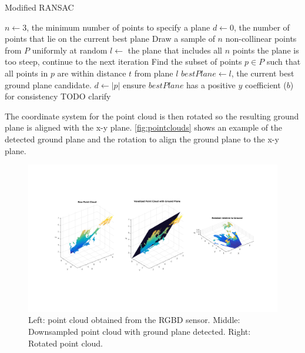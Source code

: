 \begin{algorithm}
\caption{Modified RANSAC}
\label{alg:modifiedRansac}
\begin{algorithmic}[1]
\Statex
{}
    \State $n \gets 3$, the minimum number of points to specify a plane
    \State $d \gets 0$, the number of points that lie on the current best plane
        \State Draw a sample of $n$ non-collinear points from $P$ uniformly at random
        \State $l \gets$ the plane that includes all $n$ points
            \State the plane is too steep, continue to the next iteration
        \EndIf
        \State Find the subset of points $p \in P$ such that all points in $p$ are
        within distance $t$ from plane $l$
            \State $bestPlane \gets l$, the current best ground plane candidate.
            \State $d \gets |p|$
        \EndIf
    \EndFor
    \State ensure $bestPlane$ has a positive $y$ coefficient ($b$) for consistency TODO clarify
\EndFunction
\Statex
{}
\end{algorithmic}
\end{algorithm}

The coordinate system for the point cloud is then rotated so the resulting
ground plane is aligned with the x-y plane. \autoref{fig:pointclouds} shows an
example of the detected ground plane and the rotation to align the ground plane
to the x-y plane.

\begin{figure}
\centering
\includegraphics[width=6in]{figures/pointclouds.png}
\caption{Left: point cloud obtained from the RGBD sensor. Middle:
Downsampled point cloud with ground plane detected. Right: Rotated point cloud.}
\label{fig:pointclouds}
\end{figure}

